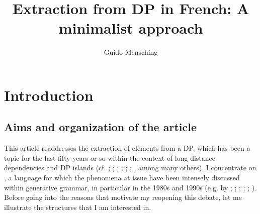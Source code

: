 \documentclass[output=paper]{langsci/langscibook}
\author{Guido Mensching\affiliation{Georg-August-Universität Göttingen}}
\title{Extraction from DP in French: A minimalist approach}
\begin{document}
\section{Introduction}%

\subsection{Aims and organization of the article}%

This article readdresses the extraction of elements from a DP, which has been a topic for the last fifty years or so within the context of long-distance dependencies and DP islands (cf. \citealt{Ross1967}; \citealt{Sportiche1981}; \citealt{Huang1982}; \citealt{Obenauer1985Connectedness,Obenauer1985identification,Obenauer1994}; \citealt{Chomsky1986Barriers}; \citealt{Cinque1990}; \citealt{Szabolcsi2006}, among many others). I concentrate on , a language for which the phenomena at issue have been intensely discussed within generative grammar, in particular in the 1980s and 1990s (e.g. by \citealt{Tellier1990}; \citealt{Sportiche1981}; \citealt{Obenauer1994}; \citealt{Pollock1989}; \citealt{Valois1991}; \citealt{Godard1992}). Before going into the reasons that motivate my reopening this debate, let me illustrate the structures that I am interested in.

\ea%
    \label{ex:mensch:1}
    \z
\z    
\end{document}
